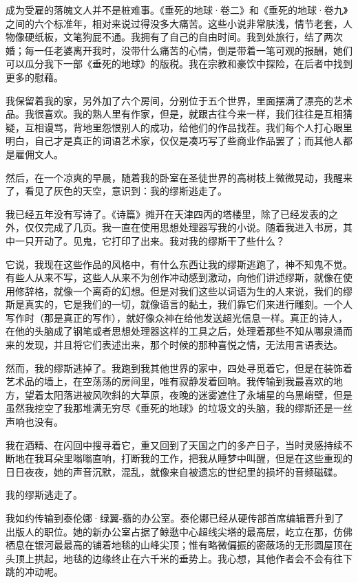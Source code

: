 \documentclass[AutoFakeBold=true]{book}
\begin{document}
\vspace*{1em}

成为受雇的落魄文人并不是桩难事。《垂死的地球·卷二》和《垂死的地球·卷九》之间的六个标准年，相对来说过得没多大痛苦。这些小说非常肤浅，情节老套，人物像硬纸板，文笔狗屁不通。我拥有了自己的自由时间。我到处旅行，结了两次婚；每一任老婆离开我时，没带什么痛苦的心情，倒是带着一笔可观的报酬，她们可以瓜分我下一部《垂死的地球》的版税。我在宗教和豪饮中探险，在后者中找到更多的慰藉。

我保留着我的家，另外加了六个房间，分别位于五个世界，里面摆满了漂亮的艺术品。我很喜欢。我的熟人里有作家，但是，就跟古往今来一样，我们往往是互相猜疑，互相谩骂，背地里怨恨别人的成功，给他们的作品找茬。我们每个人打心眼里明白，自己才是真正的词语艺术家，仅仅是凑巧写了些商业作品罢了；而其他人都是雇佣文人。

然后，在一个凉爽的早晨，随着我的卧室在圣徒世界的高树枝上微微晃动，我醒来了，看见了灰色的天空，意识到：我的缪斯逃走了。

我已经五年没有写诗了。《诗篇》摊开在天津四丙的塔楼里，除了已经发表的之外，仅仅完成了几页。我一直在使用思想处理器写我的小说。随着我进入书房，其中一只开动了。{\heiti 见鬼}，它打印了出来。{\heiti 我对我的缪斯干了些什么？}

它说，我现在这些作品的风格中，有什么东西让我的缪斯逃跑了，神不知鬼不觉。有些人从来不写，这些人从来不为创作冲动感到激动，向他们讲述缪斯，就像在使用修辞格，就像一个离奇的幻想。但是对我们这些以词语为生的人来说，我们的缪斯是真实的，它是我们的一切，就像语言的黏土，我们靠它们来进行雕刻。一个人写作时（那是真正的写作），就好像众神在给他发送超光信息一样。真正的诗人，在他的头脑成了钢笔或者思想处理器这样的工具之后，处理着那些不知从哪泉涌而来的发现，并且将它们表述出来，那个时候的那种喜悦之情，无法用言语表达。

然而，我的缪斯逃掉了。我跑到我其他世界的家中，四处寻觅着它，但是在装饰着艺术品的墙上，在空荡荡的房间里，唯有寂静发着回响。我传输到我最喜欢的地方，望着太阳落进被风吹斜的大草原，夜晚的迷雾遮住了永埔星的乌黑峭壁，但是虽然我挖空了我那堆满无穷尽《垂死的地球》的垃圾文的头脑，我的缪斯还是一丝声响也没有。

我在酒精、在闪回中搜寻着它，重又回到了天国之门的多产日子，当时灵感持续不断地在我耳朵里嗡嗡直响，打断我的工作，把我从睡梦中叫醒，但是在这些重现的日日夜夜，她的声音沉默，混乱，就像来自被遗忘的世纪里的损坏的音频磁碟。

我的缪斯逃走了。

\vspace*{1em}

我如约传输到泰伦娜·绿翼-翡的办公室。泰伦娜已经从硬传部首席编辑晋升到了出版人的职位。她的新办公室占据了鲸逖中心超线尖塔的最高层，屹立在那，仿佛栖息在银河最最高的铺着地毯的山峰尖顶；惟有略微偏振的密蔽场的无形圆屋顶在头顶上拱起，地毯的边缘终止在六千米的垂势上。我心想，其他作者会不会有往下跳的冲动呢。
\end{document}
